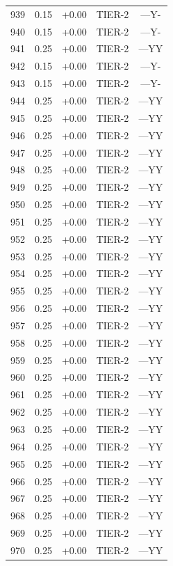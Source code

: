\begin{longtable}{rlclc}
939 & 0.15 & +0.00 & TIER-2 & ---Y-\\
940 & 0.15 & +0.00 & TIER-2 & ---Y-\\
941 & 0.25 & +0.00 & TIER-2 & ---YY\\
942 & 0.15 & +0.00 & TIER-2 & ---Y-\\
943 & 0.15 & +0.00 & TIER-2 & ---Y-\\
944 & 0.25 & +0.00 & TIER-2 & ---YY\\
945 & 0.25 & +0.00 & TIER-2 & ---YY\\
946 & 0.25 & +0.00 & TIER-2 & ---YY\\
947 & 0.25 & +0.00 & TIER-2 & ---YY\\
948 & 0.25 & +0.00 & TIER-2 & ---YY\\
949 & 0.25 & +0.00 & TIER-2 & ---YY\\
950 & 0.25 & +0.00 & TIER-2 & ---YY\\
951 & 0.25 & +0.00 & TIER-2 & ---YY\\
952 & 0.25 & +0.00 & TIER-2 & ---YY\\
953 & 0.25 & +0.00 & TIER-2 & ---YY\\
954 & 0.25 & +0.00 & TIER-2 & ---YY\\
955 & 0.25 & +0.00 & TIER-2 & ---YY\\
956 & 0.25 & +0.00 & TIER-2 & ---YY\\
957 & 0.25 & +0.00 & TIER-2 & ---YY\\
958 & 0.25 & +0.00 & TIER-2 & ---YY\\
959 & 0.25 & +0.00 & TIER-2 & ---YY\\
960 & 0.25 & +0.00 & TIER-2 & ---YY\\
961 & 0.25 & +0.00 & TIER-2 & ---YY\\
962 & 0.25 & +0.00 & TIER-2 & ---YY\\
963 & 0.25 & +0.00 & TIER-2 & ---YY\\
964 & 0.25 & +0.00 & TIER-2 & ---YY\\
965 & 0.25 & +0.00 & TIER-2 & ---YY\\
966 & 0.25 & +0.00 & TIER-2 & ---YY\\
967 & 0.25 & +0.00 & TIER-2 & ---YY\\
968 & 0.25 & +0.00 & TIER-2 & ---YY\\
969 & 0.25 & +0.00 & TIER-2 & ---YY\\
970 & 0.25 & +0.00 & TIER-2 & ---YY\\
\end{longtable}
